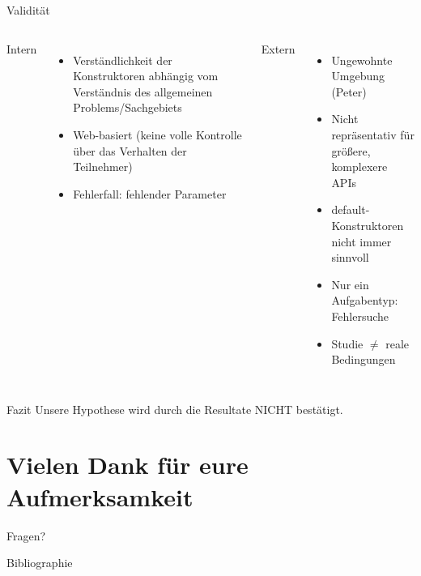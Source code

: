 \documentclass[10pt]{beamer}
\begin{document}
	\begin{frame}{Validität}
		\begin{columns}[T,onlytextwidth]
	
			Intern
			\begin{itemize}
				\item Verständlichkeit der Konstruktoren abhängig vom Verständnis des allgemeinen Problems/Sachgebiets
				\item Web-basiert (keine volle Kontrolle über das Verhalten der Teilnehmer)
				\item Fehlerfall: fehlender Parameter
			\end{itemize}
		
			Extern
			\begin{itemize}
				\item Ungewohnte Umgebung (Peter)
				\item Nicht repräsentativ für größere, komplexere APIs
				\item default-Konstruktoren nicht immer sinnvoll
				\item Nur ein Aufgabentyp: Fehlersuche
				\item Studie $\neq$ reale Bedingungen
			\end{itemize}
		\end{columns}	
	
	\end{frame}
	
	\begin{frame}[standout]{Fazit}
		Unsere Hypothese wird durch die Resultate NICHT bestätigt.
	\end{frame}

\section{Vielen Dank für eure Aufmerksamkeit}

\appendix

	\begin{frame}[standout]
		Fragen?
	\end{frame}

	\begin{frame}[allowframebreaks]{Bibliographie}
		
		
	\end{frame}

\end{document}
